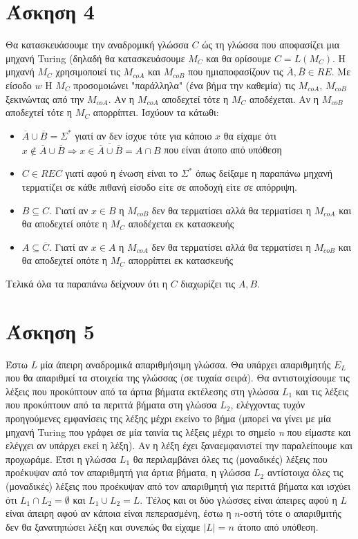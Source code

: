 \documentclass[11pt]{article}
\begin{document}
\section*{Άσκηση 4}
Θα κατασκευάσουμε την αναδρομική γλώσσα $C$ ώς τη γλώσσα που αποφασίζει μια μηχανή Turing 
(δηλαδή θα κατασκευάσουμε $M_C$ και θα ορίσουμε $C=L(M_C)$. Η μηχανή $M_C$
χρησιμοποιεί τις $M_{coA}$ και $M_{coB}$ που ημιαποφασίζουν τις $\overline{A},\overline{B}\in RE$.
Με είσοδο $w$ H $M_C$ προσομοιώνει "παράλληλα" (ένα βήμα την καθεμία) τις $M_{coA}$, $M_{coB}$
ξεκινώντας από την $M_{coA}$. Αν η $M_{coA}$ αποδεχτεί τότε η $M_C$ αποδέχεται. Αν η $M_{coB}$ αποδεχτεί
τότε η $M_C$ απορρίπτει. Ισχύουν τα κάτωθι:
\begin{itemize}
  \item  $\overline{A}\cup \overline{B} = \Sigma^*$ γιατί αν δεν ίσχυε τότε για κάποιο $x$ θα είχαμε ότι
    $x\notin\overline{A}\cup \overline{B} \Rightarrow x\in\overline{\overline{A}\cup \overline{B}}=A\cap B$
    που είναι άτοπο από υπόθεση
  \item $C\in REC$ γιατί αφού η ένωση είναι το $\Sigma^*$ όπως δείξαμε η παραπάνω μηχανή τερματίζει σε 
    κάθε πιθανή είσοδο είτε σε αποδοχή είτε σε απόρριψη.
  \item $B\subseteq C$. Γιατί αν $x\in B$ η $M_{coB}$ δεν θα τερματίσει αλλά θα τερματίσει η  
    $M_{coA}$ και θα αποδεχτεί οπότε η $M_C$ αποδέχεται εκ κατασκευής
  \item $A\subseteq \overline{C}$. Γιατί αν $x\in A$ η $M_{coA}$ δεν θα τερματίσει αλλά θα τερματίσει η  
    $M_{coB}$ και θα αποδεχτεί οπότε η $M_C$ απορρίπτει εκ κατασκευής
\end{itemize}
Τελικά όλα τα παραπάνω δείχνουν ότι η $C$ διαχωρίζει τις $A,B$.


\section*{Άσκηση 5}
Έστω \textit{L} μία άπειρη αναδρομικά απαριθμήσιμη γλώσσα. Θα υπάρχει απαριθμητής $E_L$ που θα απαριθμεί τα στοιχεία της γλώσσας (σε τυχαία σειρά). Θα αντιστοιχίσουμε τις λέξεις που προκύπτουν από τα άρτια βήματα εκτέλεσης στη γλώσσα $L_1$ και τις λέξεις που προκύπτουν από τα περιττά βήματα στη γλώσσα $L_2$, ελέγχοντας τυχόν προηγούμενες εμφανίσεις της λέξης μέχρι εκείνο το βήμα (μπορεί να γίνει με μία μηχανή Turing που γράφει σε μία ταινία τις λέξεις μέχρι το σημείο \textit{n} που είμαστε και ελέγχει αν υπάρχει εκεί η λέξη). Αν η λέξη έχει ξαναεμφανιστεί την παραλείπουμε και προχωράμε. Έτσι η γλώσσα $L_1$ θα περιλαμβάνει όλες τις (μοναδικές) λέξεις που προέκυψαν από τον απαριθμητή για άρτια βήματα, η γλώσσα $L_2$ αντίστοιχα όλες τις (μοναδικές) λέξεις που προέκυψαν από τον απαριθμητή για περιττά βήματα και ισχύει ότι $L_1 \cap L_2 = \emptyset$ και $L_1 \cup L_2 = L$.
Τέλος και οι δύο γλώσσες είναι άπειρες αφού η $L$ είναι άπειρη αφού αν κάποια είναι πεπερασμένη, έστω η $n$-οστή τότε ο απαριθμιτής δεν θα ξανατηπώσει λέξη και συνεπώς θα είχαμε $|L|=n$ άτοπο από υπόθεση.
\end{document}
